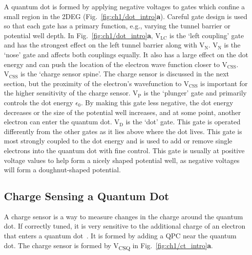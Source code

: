 A quantum dot is formed by applying negative voltages to gates which confine a small region in the 2DEG (Fig.~\ref{fig:ch1/dot_intro}\textbf{a}).
Careful gate design is used so that each gate has a primary function, e.g., varying the tunnel barrier or potential well depth. In Fig.~\ref{fig:ch1/dot_intro}\textbf{a}, $\mathrm{V_{LC}}$ is the `left coupling' gate and has the strongest effect on the left tunnel barrier along with $\mathrm{V_{N}}$. $\mathrm{V_{N}}$ is the `nose' gate and affects both couplings equally. It also has a large effect on the dot energy and can push the location of the electron wave function closer to $\mathrm{V_{CSS}}$. $\mathrm{V_{CSS}}$ is the `charge sensor spine'. The charge sensor is discussed in the next section, but the proximity of the electron's wavefunction to $\mathrm{V_{CSS}}$ is important for the higher sensitivity of the charge sensor. $\mathrm{V_{P}}$ is the `plunger' gate and primarily controls the dot energy $\epsilon_0$. By making this gate less negative, the dot energy decreases or the size of the potential well increases, and at some point, another electron can enter the quantum dot. $\mathrm{V_{D}}$ is the `dot' gate. This gate is operated differently from the other gates as it lies above where the dot lives. This gate is most strongly coupled to the dot energy and is used to add or remove single electrons into the quantum dot with fine control. This gate is usually at positive voltage values to help form a nicely shaped potential well, as negative voltages will form a doughnut-shaped potential. 





\afterpage{\clearpage}
\subsection{Charge Sensing a Quantum Dot}


A charge sensor is a way to measure changes in the charge around the quantum dot. If correctly tuned, it is very sensitive to the additional charge of an electron that enters a quantum dot~\cite{Field1993,Schleser2004,Vandersypen2004}. It is formed by adding a QPC near the quantum dot. The charge sensor is formed by V\textsubscript{CSQ} in Fig.~\ref{fig:ch1/ct_intro}\textbf{a}. 

